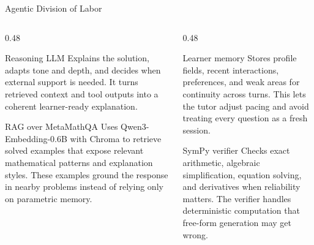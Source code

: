\documentclass[aspectratio=169]{beamer}
\begin{document}
\begin{frame}{Agentic Division of Labor}
  \small
  \begin{columns}[T,onlytextwidth]
    \begin{column}{0.48\textwidth}
      \begin{block}{Reasoning LLM}
        Explains the solution, adapts tone and depth, and decides when external
        support is needed. It turns retrieved context and tool outputs into a
        coherent learner-ready explanation.
      \end{block}
      \begin{block}{RAG over MetaMathQA}
        Uses Qwen3-Embedding-0.6B with Chroma to retrieve solved examples that
        expose relevant mathematical patterns and explanation styles. These
        examples ground the response in nearby problems instead of relying only
        on parametric memory.
      \end{block}
    \end{column}
    \begin{column}{0.48\textwidth}
      \begin{block}{Learner memory}
        Stores profile fields, recent interactions, preferences, and weak
        areas for continuity across turns. This lets the tutor adjust pacing
        and avoid treating every question as a fresh session.
      \end{block}
      \begin{block}{SymPy verifier}
        Checks exact arithmetic, algebraic simplification, equation solving,
        and derivatives when reliability matters. The verifier handles
        deterministic computation that free-form generation may get wrong.
      \end{block}
    \end{column}
  \end{columns}
\end{frame}
\end{document}

